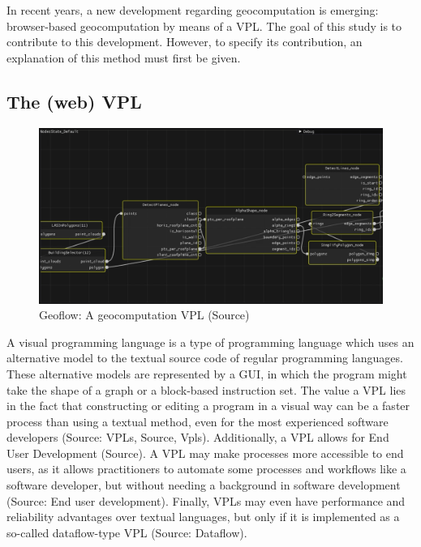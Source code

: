 In recent years, a new development regarding geocomputation is emerging:
browser-based geocomputation by means of a \ac{VPL}.
The goal of this study is to contribute to this development. 
However, to specify its contribution, an explanation of this method must first be given.

\subsection*{The (web) VPL}

\begin{figure}
  \centering
  \graphicspath{{../../assets/images/background/geo-vpl/}}
  \includegraphics[width=\linewidth]{geoflow.png}
  \caption{Geoflow: A geocomputation VPL (Source)}
  \label{fig:1:geoflow}
\end{figure}

A visual programming language is a type of programming language which uses an alternative model to the textual source code of regular programming languages. 
These alternative models are represented by a \ac{GUI}, in which the program might take the shape of a graph or a block-based instruction set. 
The value a VPL lies in the fact that constructing or editing a program in a visual way can be a faster process than using a textual method, even for the most experienced software developers (Source: VPLs, Source, Vpls). 
Additionally, a \ac{VPL} allows for End User Development (Source). 
A \ac{VPL} may make processes more accessible to end users, as it allows practitioners to automate some processes and workflows like a software developer, but without needing a background in software development (Source: End user development). 
Finally, VPLs may even have performance and reliability advantages over textual languages, but only if it is implemented as a so-called dataflow-type VPL (Source: Dataflow). 

